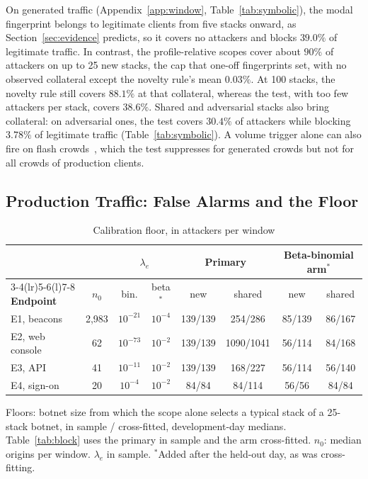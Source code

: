 \documentclass[conference,letterpaper,10pt]{IEEEtran}
\newcommand\1{\textit{(i)}}
\newcommand\2{\textit{(ii)}}
\newcommand\3{\textit{(iii)}}
\newcommand\4{\textit{(iv)}}
\newcommand\5{\textit{(v)}}
\newcommand\6{\textit{(vi)}}
\newcommand\7{\textit{(vii)}}
\newcommand\8{\textit{(viii)}}
\newcommand\9{\textit{(ix)}}
\begin{document}
On generated traffic (Appendix~\ref{app:window}, Table~\ref{tab:symbolic}), the modal fingerprint belongs to legitimate clients from five stacks onward, as Section~\ref{sec:evidence} predicts, so it covers no attackers and blocks $39.0\%$ of legitimate traffic. In contrast, the profile-relative scopes cover about $90\%$ of attackers on up to 25 new stacks, the cap that one-off fingerprints set, with no observed collateral except the novelty rule's mean $0.03\%$. At 100 stacks, the novelty rule still covers $88.1\%$ at that collateral, whereas the test, with too few attackers per stack, covers $38.6\%$. Shared and adversarial stacks also bring collateral: on adversarial ones, the test covers $30.4\%$ of attackers while blocking $3.78\%$ of legitimate traffic (Table~\ref{tab:symbolic}). A volume trigger alone can also fire on flash crowds~\cite{jung2002flash}, which the test suppresses for generated crowds but not for all crowds of production clients.

\subsection{Production Traffic: False Alarms and the Floor}
\label{sec:fleetfloor}
\label{sec:production}
\begin{table}[t]
\centering
\caption{Calibration floor, in attackers per window}
\label{tab:floor}
\scriptsize
\setlength{\tabcolsep}{2.2pt}
\begin{tabular}{@{}lccccccc@{}}
\toprule
 & & \multicolumn{2}{c}{$\lambda_e$} & \multicolumn{2}{c}{\textbf{Primary}} & \multicolumn{2}{c}{\textbf{Beta-binomial arm}$^{*}$} \\
\cmidrule(lr){3-4}\cmidrule(lr){5-6}\cmidrule(l){7-8}
\textbf{Endpoint} & $n_0$ & bin. & beta$^{*}$ & new & shared & new & shared \\
\midrule
E1, beacons     & 2,983  & $10^{-21}$ & $10^{-4}$ & 139/139 & 254/286 & 85/139 & 86/167 \\
E2, web console & 62      & $10^{-73}$ & $10^{-2}$ & 139/139 & 1090/1041 & 56/114 & 84/168 \\
E3, API         & 41      & $10^{-11}$ & $10^{-2}$ & 139/139 & 168/227 & 56/114 & 56/140 \\
E4, sign-on     & 20      & $10^{-4}$ & $10^{-2}$ & 84/84 & 84/114 & 56/56 & 84/84 \\
\bottomrule
\end{tabular}

\vspace{2pt}
\begin{minipage}{\linewidth}\footnotesize Floors: botnet size from which the scope alone selects a typical stack of a 25-stack botnet, in sample / cross-fitted, development-day medians. Table~\ref{tab:block} uses the primary in sample and the arm cross-fitted. $n_0$: median origins per window. $\lambda_e$ in sample. $^{*}$Added after the held-out day, as was cross-fitting.\end{minipage}
\end{table}
\end{document}
